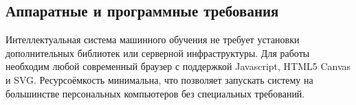 \subsection{Аппаратные и программные требования}

Интеллектуальная система машинного обучения не требует установки дополнительных библиотек или серверной инфраструктуры. Для работы необходим любой современный браузер с поддержкой Javascript, HTML5 Canvas и SVG. Ресурсоёмкость минимальна, что позволяет запускать систему на большинстве персональных компьютеров без специальных требований.
